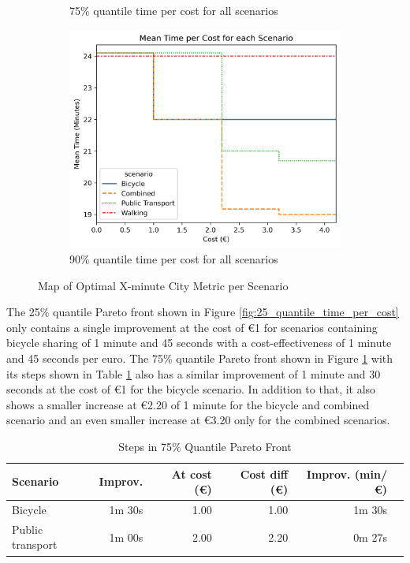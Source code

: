 \begin{figure}
\begin{subfigure}[b]{0.48\textwidth}
         \caption{75\% quantile time per cost for all scenarios}
         \label{fig:75_quantile_time_per_cost}
     \end{subfigure}
     \hfill
     \begin{subfigure}[b]{0.48\textwidth}
         \centering
         \includegraphics[width=\textwidth]{Figures/results/metric_cost/quantile_90_time_per_cost_for_each_scenario_without_car.png}
         \caption{90\% quantile time per cost for all scenarios}
         \label{fig:90_quantile_time_per_cost}
     \end{subfigure}
        \caption{Map of Optimal X-minute City Metric per Scenario}
        \label{fig:quantile_time_per_cost}
\end{figure}
The 25\% quantile Pareto front shown in Figure \ref{fig:25_quantile_time_per_cost} only contains a single improvement at the cost of \euro{1} for scenarios containing bicycle sharing of 1 minute and 45 seconds with a cost-effectiveness of 1 minute and 45 seconds per euro.
The 75\% quantile Pareto front shown in Figure \ref{fig:75_quantile_time_per_cost} with its steps shown in Table \ref{tab:differences_in_75_quantile_pareto_front} also has a similar improvement of 1 minute and 30 seconds at the cost of \euro{1} for the bicycle scenario.
In addition to that, it also shows a smaller increase at \euro{2.20} of 1 minute for the bicycle and combined scenario and an even smaller increase at \euro{3.20} only for the combined scenarios.
\begin{table}
  \caption{Steps in 75\% Quantile Pareto Front}
  \label{tab:differences_in_75_quantile_pareto_front}
  \begin{center}
    \begin{tabular}{|l|r|r|r|r|l|}
    \hline
     Scenario & Improv. & At cost (\euro) & Cost diff (\euro) & Improv. (min/\euro) \\
     \hline
     Bicycle & 1m 30s & 1.00 & 1.00 & 1m 30s \\
     \hline
     Public transport & 1m 00s & 2.00 & 2.20 & 0m 27s \\
     \hline
    \end{tabular}
  \end{center}
\end{table}

